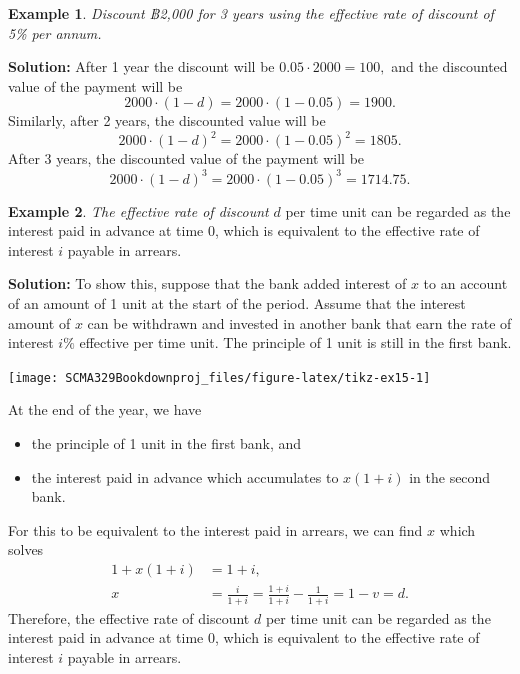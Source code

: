 \documentclass[
]{book}
\theoremstyle{definition}
\theoremstyle{definition}
\newtheorem{example}{Example}[chapter]
\theoremstyle{definition}
\theoremstyle{definition}
\theoremstyle{remark}
\begin{document}
\begin{example}
\emph{Discount ฿2,000 for 3 years using the effective rate of discount of 5\%
per annum.}
\end{example}

\textbf{Solution:} After 1 year the discount will be \(0.05 \cdot 2000 = 100,\)
and the discounted value of the payment will be
\[2000 \cdot (1 - d) = 2000 \cdot (1 - 0.05) = 1900 .\] Similarly, after
2 years, the discounted value will be
\[2000 \cdot (1 - d)^2 = 2000 \cdot (1 - 0.05)^2 = 1805 .\] After 3
years, the discounted value of the payment will be
\[2000 \cdot (1 - d)^3 = 2000 \cdot (1 - 0.05)^3 = 1714.75 .\]

\begin{example}
\emph{The effective rate of discount} \(d\) per time unit can be regarded as
the interest paid in advance at time 0, which is equivalent to the
effective rate of interest \(i\) payable in arrears.
\end{example}

\textbf{Solution:} To show this, suppose that the bank added interest of \(x\)
to an account of an amount of 1 unit at the start of the period. Assume
that the interest amount of \(x\) can be withdrawn and invested in another
bank that earn the rate of interest \(i\%\) effective per time unit. The
principle of 1 unit is still in the first bank.

\begin{center}\texttt{[image: SCMA329Bookdownproj\_files/figure-latex/tikz-ex15-1]} \end{center}

At the end of the year, we have

\begin{itemize}
\item
  the principle of 1 unit in the first bank, and
\item
  the interest paid in advance which accumulates to \(x(1+i)\) in the
  second bank.
\end{itemize}

For this to be equivalent to the interest paid in arrears, we can find
\(x\) which solves \[\begin{aligned}
     1 + x(1+i) &= 1 + i,\\
     x &= \frac{i}{1+i} = \frac{1+i}{1+i} - \frac{1}{1+i}  = 1-v = d.\end{aligned}\]
Therefore, the effective rate of discount \(d\) per time unit can be
regarded as the interest paid in advance at time 0, which is equivalent
to the effective rate of interest \(i\) payable in arrears.
\end{document}
